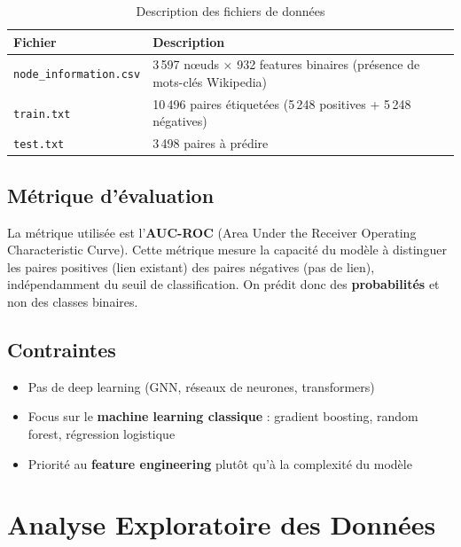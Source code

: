 \documentclass[12pt,a4paper]{article}
\begin{document}
\begin{table}[H]
\centering
\begin{tabular}{lp{9cm}}
\toprule
\textbf{Fichier} & \textbf{Description} \\
\midrule
\texttt{node\_information.csv} & 3\,597 nœuds × 932 features binaires (présence de mots-clés Wikipedia) \\
\texttt{train.txt} & 10\,496 paires étiquetées (5\,248 positives + 5\,248 négatives) \\
\texttt{test.txt} & 3\,498 paires à prédire \\
\bottomrule
\end{tabular}
\caption{Description des fichiers de données}
\end{table}

\subsection{Métrique d'évaluation}

La métrique utilisée est l'\textbf{AUC-ROC} (Area Under the Receiver Operating Characteristic Curve). Cette métrique mesure la capacité du modèle à distinguer les paires positives (lien existant) des paires négatives (pas de lien), indépendamment du seuil de classification. On prédit donc des \textbf{probabilités} et non des classes binaires.

\subsection{Contraintes}

\begin{itemize}
    \item Pas de deep learning (GNN, réseaux de neurones, transformers)
    \item Focus sur le \textbf{machine learning classique} : gradient boosting, random forest, régression logistique
    \item Priorité au \textbf{feature engineering} plutôt qu'à la complexité du modèle
\end{itemize}

\newpage
\section{Analyse Exploratoire des Données}
\end{document}
